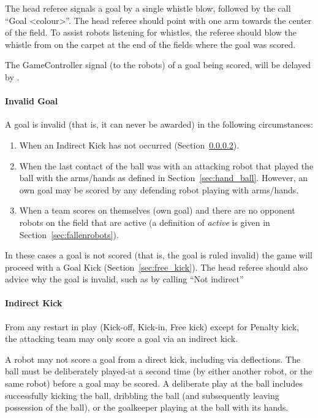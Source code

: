 The head referee signals a goal by a single whistle blow, followed by the call ``Goal \textless colour\textgreater''. The head referee should point with one arm towards the center of the field.
To assist robots listening for whistles, the referee should blow the whistle from on the carpet at the end of the fields where the goal was scored.

The GameController signal (to the robots) of a goal being scored, will be delayed by \GoalScoredDelay.

\paragraph{Invalid Goal}
\label{sec:invalid_goal}
A goal is invalid (that is, it can never be awarded) in the following circumstances:
\begin{enumerate}
    \item When an Indirect Kick has not occurred (\cf Section~\ref{sec:indirect_kick}).
    \item When the last contact of the ball was with an attacking robot that played the ball with the arms/hands as defined in Section~\ref{sec:hand_ball}. However, an own goal may be scored by any defending robot playing with arms/hands.
    \item When a team scores on themselves (\ie own goal) and there are no opponent robots on the field that are active (a definition of \emph{active} is given in Section~\ref{sec:fallenrobots}).
\end{enumerate}

In these cases a goal is not scored (that is, the goal is ruled invalid) the game will proceed with a Goal Kick (\cf Section~\ref{sec:free_kick}). The head referee should also advice why the goal is invalid, such as by calling ``Not indirect''

\paragraph{Indirect Kick}
\label{sec:indirect_kick}
From any restart in play (Kick-off, Kick-in, Free kick) except for Penalty kick, the attacking team may only score a goal via an indirect kick.

A robot may not score a goal from a direct kick, including via deflections.
The ball must be deliberately played-at a second time (by either another robot, or the same robot) before a goal may be scored.
A deliberate play at the ball includes successfully kicking the ball, dribbling the ball (and subsequently leaving possession of the ball), or the goalkeeper playing at the ball with its hands. 

